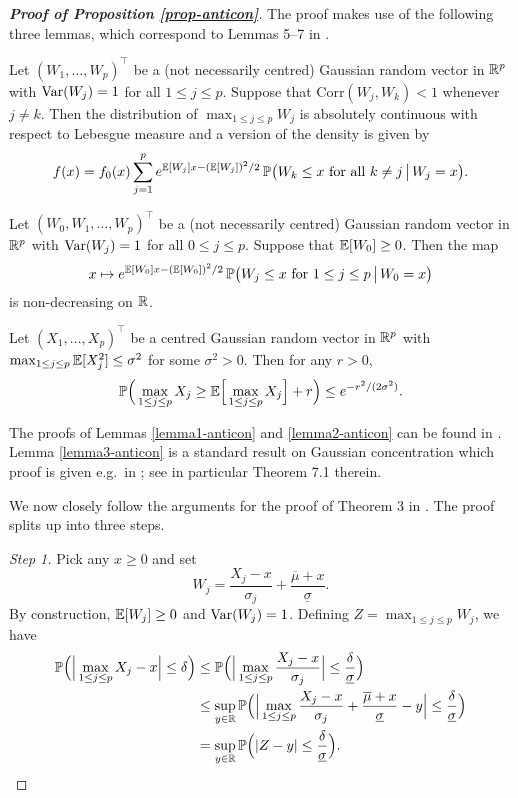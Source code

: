 \documentclass[a4paper,12pt]{article}
\numberwithin{equation}{section}
\begin{document}
\begin{proof}[\textnormal{\textbf{Proof of Proposition \ref{prop-anticon}}}] 
The proof makes use of the following three lemmas, which correspond to Lemmas 5--7 in \cite{Chernozhukov2015}. 
\begin{lemmaA}\label{lemma1-anticon}
Let $(W_1,\ldots,W_p)^\top$ be a (not necessarily centred) Gaussian random vector in $\mathbb{R}^p$ with $\textnormal{Var}(W_j) = 1$ for all $1 \le j \le p$. Suppose that $\text{Corr}(W_j,W_k) < 1$ whenever $j \ne k$. Then the distribution of $\max_{1 \le j \le p} W_j$ is absolutely continuous with respect to Lebesgue measure and a version of the density is given by 
\[ f(x) = f_0(x) \sum\limits_{j=1}^p e^{\mathbb{E}[W_j]x - (\mathbb{E}[W_j])^2/2} \, \mathbb{P} \big(W_k \le x \text{ for all } k \ne j \, \big| \, W_j = x \big). \]
\end{lemmaA}
\begin{lemmaA}\label{lemma2-anticon}
Let $(W_0,W_1,\ldots,W_p)^\top$ be a (not necessarily centred) Gaussian random vector in $\mathbb{R}^p$ with $\textnormal{Var}(W_j) = 1$ for all $0 \le j \le p$. Suppose that $\mathbb{E}[W_0] \ge 0$. Then the map 
\[ x \mapsto  e^{\mathbb{E}[W_0]x - (\mathbb{E}[W_0])^2/2} \, \mathbb{P} \big(W_j \le x \text{ for } 1 \le j \le p \, \big| \, W_0 = x \big) \]
is non-decreasing on $\mathbb{R}$. 
\end{lemmaA}
\begin{lemmaA}\label{lemma3-anticon}
Let $(X_1,\ldots,X_p)^\top$ be a centred Gaussian random vector in $\mathbb{R}^p$ with $\max_{1 \le j \le p} \mathbb{E}[X_j^2] \le \sigma^2$ for some $\sigma^2 > 0$. Then for any $r > 0$, 
\[ \mathbb{P} \Big( \max_{1 \le j \le p} X_j \ge \mathbb{E} \Big[ \max_{1 \le j \le p} X_j \Big] + r \Big) \le e^{-r^2/(2\sigma^2)}. \]
\end{lemmaA} 
The proofs of Lemmas \ref{lemma1-anticon} and \ref{lemma2-anticon} can be found in \cite{Chernozhukov2015}. Lemma \ref{lemma3-anticon} is a standard result on Gaussian concentration which proof is given e.g.\ in \cite{Ledoux2001}; see in particular Theorem 7.1 therein.

We now closely follow the arguments for the proof of Theorem 3 in \cite{Chernozhukov2015}. The proof splits up into three steps. 
\vspace{10pt}


\textit{Step 1.} Pick any $x \ge 0$ and set 
\[ W_j = \frac{X_j - x}{\sigma_j} + \frac{\overline{\mu} + x}{\underline{\sigma}}. \]
By construction, $\mathbb{E}[W_j] \ge 0$ and $\textnormal{Var}(W_j) = 1$. Defining $Z = \max_{1 \le j \le p} W_j$, we have  
\begin{align*}
\mathbb{P} \Big( \Big| \max_{1 \le j \le p} X_j - x \Big| \le \delta \Big) 
 & \le \mathbb{P} \Big( \Big| \max_{1 \le j \le p} \frac{X_j - x}{\sigma_j} \Big| \le \frac{\delta}{\underline{\sigma}} \Big) \\
 & \le \sup_{y \in \mathbb{R}} \mathbb{P} \Big( \Big| \max_{1 \le j \le p} \frac{X_j - x}{\sigma_j} + \frac{\overline{\mu} + x}{\underline{\sigma}} - y \Big| \le \frac{\delta}{\underline{\sigma}} \Big) \\
 & = \sup_{y \in \mathbb{R}} \mathbb{P} \Big( |Z - y| \le \frac{\delta}{\underline{\sigma}} \Big). 
\end{align*}
\vspace{1pt}



\end{proof}
\end{document}
